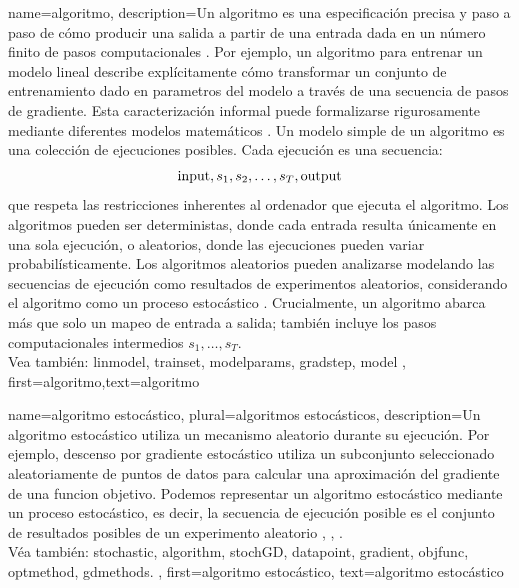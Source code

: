 {name={algoritmo},
  description={Un algoritmo es una especificación precisa y paso a paso de
    cómo producir una salida a partir de una entrada dada en un número finito de pasos computacionales \cite{Cormen:2022aa}. 
    Por ejemplo, un algoritmo para entrenar un modelo lineal describe explícitamente cómo
	transformar un conjunto de entrenamiento dado en parametros del modelo a través de una secuencia de pasos de gradiente. 
    Esta caracterización informal puede formalizarse rigurosamente mediante diferentes modelos matemáticos \cite{Sipser2013}. 
   	Un modelo simple de un algoritmo es una colección de ejecuciones posibles. Cada ejecución es una secuencia:
    $${\rm input},s_1,s_2,\ldots,s_T,{\rm output}$$ 
    que respeta las restricciones inherentes al ordenador que ejecuta el algoritmo.
	Los algoritmos pueden ser deterministas, donde cada entrada resulta únicamente en una sola ejecución,
	o aleatorios, donde las ejecuciones pueden variar probabilísticamente. Los algoritmos aleatorios 
	pueden analizarse modelando las secuencias de ejecución como resultados de experimentos aleatorios, 
	considerando el algoritmo como un proceso estocástico \cite{RandomizedAlgos,BertsekasProb,Gallager13}.
	Crucialmente, un algoritmo abarca más que solo un mapeo de entrada a salida; también incluye 
	los pasos computacionales intermedios $s_1,\ldots,s_T$. 
	\\
		Vea también: \gls{linmodel}, \gls{trainset}, \glspl{modelparam}, \gls{gradstep}, \gls{model} },
	first={algoritmo},text={algoritmo} 
}

{name={algoritmo estocástico}, 
 plural={algoritmos estocásticos},
	description={Un algoritmo estocástico utiliza un mecanismo aleatorio 
		durante su ejecución. Por ejemplo, descenso por gradiente estocástico utiliza un subconjunto seleccionado aleatoriamente 
		de puntos de datos para calcular una aproximación del gradiente de una funcion objetivo. 
		Podemos representar un algoritmo estocástico mediante un proceso estocástico, 
		es decir, la secuencia de ejecución posible es el conjunto de resultados posibles de un experimento aleatorio 
		\cite{BertsekasProb}, \cite{RandomizedAlgos}, \cite{Gallager13}.\\ 
		Véa también: \gls{stochastic}, \gls{algorithm}, \gls{stochGD}, \gls{datapoint}, \gls{gradient}, 
		\gls{objfunc}, \gls{optmethod}, \gls{gdmethods}.
	},
	first={algoritmo estocástico},
	text={algoritmo estocástico}
}


